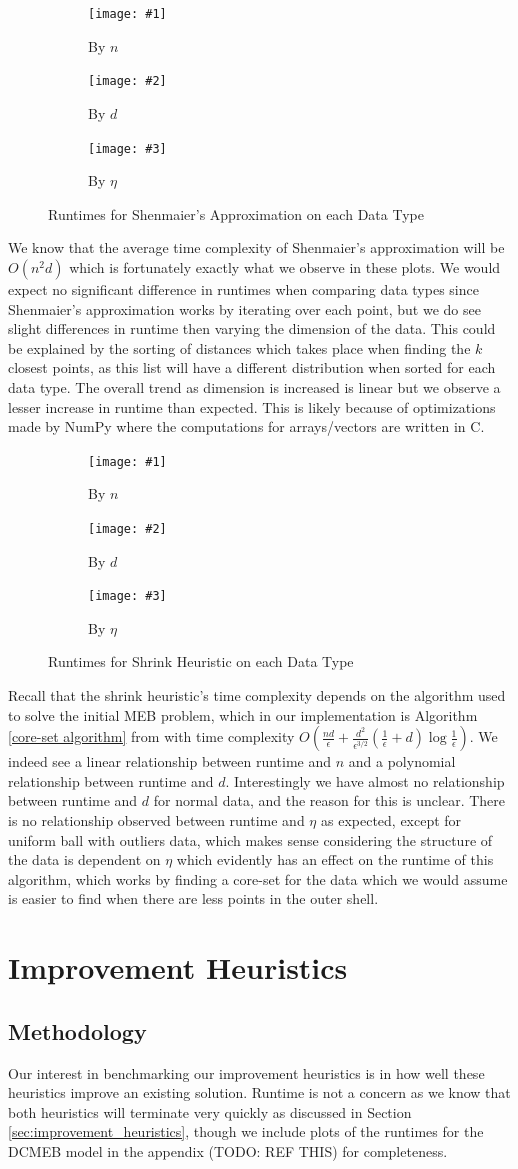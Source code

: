\documentclass[11pt,twoside]{report}
\newcommand{\benchmarkfigure}[5]{
    \begin{figure}[ht]
        \centering
        \begin{subfigure}[b]{0.475\textwidth}
            \centering
            \texttt{[image: \#1]}
            \caption{By $n$}
            \label{#5_n}
        \end{subfigure}
        \hfill
        \begin{subfigure}[b]{0.475\textwidth}
            \centering
            \texttt{[image: \#2]}
            \caption{By $d$}
            \label{#5_d}
        \end{subfigure}
        
        \begin{subfigure}[b]{0.475\textwidth}
            \centering
            \texttt{[image: \#3]}
            \caption{By $\eta$}
            \label{#5_eta}
        \end{subfigure}
        \caption{#4}
        \label{#5}
    \end{figure}
}
\newcommand{\benchmarkfigurebyfunc}[3]{
    \benchmarkfigure{alg_benchmarks/by_func/#1_func_n_d30_eta0p9.png}{alg_benchmarks/by_func/#1_func_d_n10000_eta0p9.png}{alg_benchmarks/by_func/#1_func_eta_n10000_d30.png}{#2}{#3}
}
\theoremstyle{definition}
\numberwithin{theorem}{section}
\numberwithin{definition}{section}
\numberwithin{lemma}{section}
\numberwithin{proposition}{section}
\numberwithin{equation}{section}
\numberwithin{figure}{section}
\begin{document}
\benchmarkfigurebyfunc{shenmaier}{Runtimes for Shenmaier's Approximation on each Data Type}{fig:shenmaier_benchmarks}
We know that the average time complexity of Shenmaier's approximation will be $O(n^2d)$ which is fortunately exactly what we observe in these plots. We would expect no significant difference in runtimes when comparing data types since Shenmaier's approximation works by iterating over each point, but we do see slight differences in runtime then varying the dimension of the data. This could be explained by the sorting of distances which takes place when finding the $k$ closest points, as this list will have a different distribution when sorted for each data type. The overall trend as dimension is increased is linear but we observe a lesser increase in runtime than expected. This is likely because of optimizations made by NumPy where the computations for arrays/vectors are written in C.


\benchmarkfigurebyfunc{shrink}{Runtimes for Shrink Heuristic on each Data Type}{fig:shrink_benchmarks}
Recall that the shrink heuristic's time complexity depends on the algorithm used to solve the initial MEB problem, which in our implementation is Algorithm \ref{core-set algorithm} from \cite{core-sets} with time complexity $O\left(\frac{nd}{\epsilon}+\frac{d^2}{\epsilon^{3/2}}\left(\frac{1}{\epsilon}+d\right)\log\frac{1}{\epsilon}\right)$. We indeed see a linear relationship between runtime and $n$ and a polynomial relationship between runtime and $d$. Interestingly we have almost no relationship between runtime and $d$ for normal data, and the reason for this is unclear. There is no relationship observed between runtime and $\eta$ as expected, except for uniform ball with outliers data, which makes sense considering the structure of the data is dependent on $\eta$ which evidently has an effect on the runtime of this algorithm, which works by finding a core-set for the data which we would assume is easier to find when there are less points in the outer shell.

\section{Improvement Heuristics}
\subsection{Methodology}
Our interest in benchmarking our improvement heuristics is in how well these heuristics improve an existing solution. Runtime is not a concern as we know that both heuristics will terminate very quickly as discussed in Section \ref{sec:improvement_heuristics}, though we include plots of the runtimes for the DCMEB model in the appendix (TODO: REF THIS) for completeness.
\end{document}
